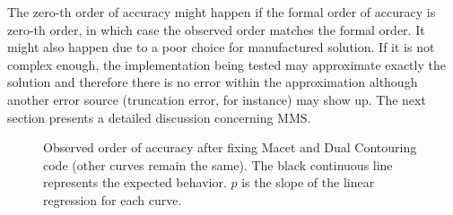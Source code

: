 The zero-th order of accuracy might happen if the formal order of accuracy 
is zero-th order, in which case the observed order matches the formal order. 
It might also happen due to a poor choice for manufactured solution. If 
it is not complex enough, the implementation being tested may approximate 
exactly the solution and therefore there is no error within the approximation 
although another error source (truncation error, for instance) may show up. 
The next section presents a detailed discussion concerning MMS.

\begin{figure}
\centering
{}
\caption{Observed order of accuracy after fixing Macet and Dual Contouring code (other curves remain the same). The black continuous line represents the expected behavior. $p$ is the slope of the linear regression for each curve.}
\label{fig:allconv-fixed}
\end{figure}



